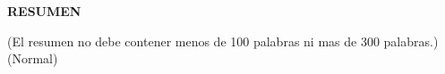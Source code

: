 

\begin{center}
    \textbf{RESUMEN}
\end{center}
\label{sec:RESUMEN}
\vspace{1cm}
(El resumen no debe contener menos de 100 palabras ni mas de 300 palabras.) (Normal)


\newpage